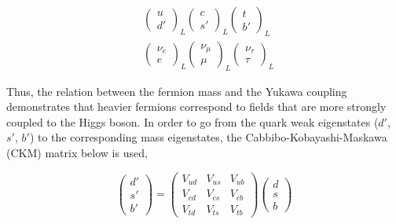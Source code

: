 \begin{equation}
\begin{split}
&  \begin{pmatrix} 
    u \\
    d'
  \end{pmatrix}_L
  \begin{pmatrix} 
    c \\
    s'
  \end{pmatrix}_L
  \begin{pmatrix} 
    t \\
    b'
  \end{pmatrix}_L
  \\
&  \begin{pmatrix} 
    \nu_e \\
    e
  \end{pmatrix}_L
  \begin{pmatrix} 
    \nu_\mu \\
    \mu
  \end{pmatrix}_L
  \begin{pmatrix} 
    \nu_\tau \\
    \tau
  \end{pmatrix}_L
\end{split}
\end{equation}

Thus, the relation between the fermion mass and the Yukawa coupling demonstrates that heavier fermions correspond to fields that are more strongly coupled to the Higgs boson. In order to go from the quark weak eigenstates ($d'$, $s'$, $b'$) to the corresponding mass eigenstates, the Cabbibo-Kobayashi-Maskawa (CKM) matrix below is used,

\begin{equation}
  \begin{pmatrix}
    d' \\
    s' \\
    b'
  \end{pmatrix} 
  =
  \begin{pmatrix}
    V_{ud} & V_{us} & V_{ub} \\
    V_{cd} & V_{cs} & V_{cb} \\
    V_{td} & V_{ts} & V_{tb}
  \end{pmatrix}
  \begin{pmatrix}
    d \\
    s \\
    b
  \end{pmatrix}
  \label{eq:CKM}
\end{equation} 

